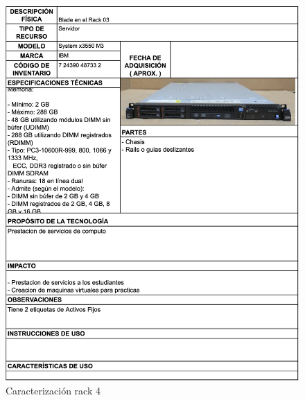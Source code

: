 \begin{figure}[H]
    \centering
    \includegraphics[width=\textwidth] {tablas-images/cp1/racks/rack-4.png}
    \caption{Caracterización rack 4}\label{fig:rack-4}
\end{figure}


